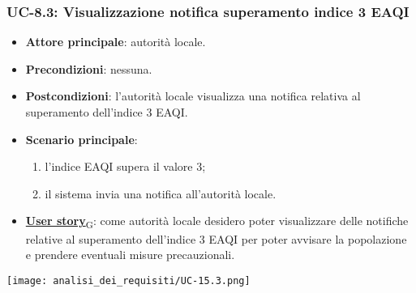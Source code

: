 \subsubsection{UC-8.3: Visualizzazione notifica superamento indice 3 EAQI}
\begin{itemize}
	\item \textbf{Attore principale}: autorità locale.
	\item \textbf{Precondizioni}: nessuna.
	\item \textbf{Postcondizioni}: l'autorità locale visualizza una notifica relativa al superamento dell'indice 3 EAQI.
	\item \textbf{Scenario principale}:
	      \begin{enumerate}
		      \item l'indice EAQI supera il valore 3;
		      \item il sistema invia una notifica all'autorità locale.
	      \end{enumerate}
	\item \href{https://7last.github.io/docs/rtb/documentazione-interna/glossario\#user-story}{\textbf{User story}\textsubscript{G}}:
	      come autorità locale desidero poter visualizzare delle notifiche relative al superamento dell'indice 3 EAQI
	      per poter avvisare la popolazione e prendere eventuali misure precauzionali.
\end{itemize}
\begin{center}
	\texttt{[image: analisi\_dei\_requisiti/UC-15.3.png]}
\end{center}


